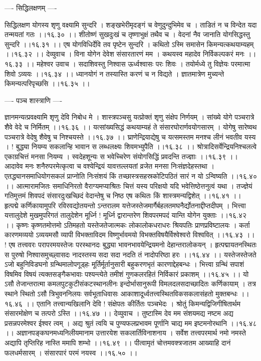 \documentclass[11pt]{book}
\begin{document}
\begin{landscape}
---- सिद्धिलक्षणम् ----

सिद्धिलक्षण योगस्य शृणु वक्ष्यामि सुन्दरि ।
शङ्खभेरीमृदङ्गं च वेणुदुन्दुभिमेव च ।
ताडितं न च विन्देत यदा तन्मयतां गतः ।।१६.३० ।।
शीतोष्णं सुखदुःखं च तृष्णाभुक्षं तथैव च ।
वेदनां नैव जानाति योगसिद्धस्तु सुन्दरि ।।१६.३१ ।।
एष योगविधिर्देवि तव पृष्टेन सुन्दरि ।
कथितो ऽस्मि समासेन किमन्यत्कथयाम्यहम् ।।१६.३२ ।।
देव्युवाच ।
विना योगेन देवेश संसारतारणं मम ।
कथयस्व महादेव निर्विकल्पकरं मनः ।।१६.३३ ।।
महेश्वर उवाच ।
सदाशिवस्तु निश्वास ऊर्ध्वश्वासः परः शिवः ।
तयोर्मध्ये तु विज्ञेयः परमात्मा शिवो ऽव्ययः ।।१६.३४ ।।
ध्यानयोगं न तस्यास्ति करणं च न विद्यते ।
ज्ञातमात्रेण मुच्यन्ते किमन्यत्परिपृच्छसि ।।१६.३५ ।।

---- पञ्च शास्त्राणि ----

ज्ञानमन्यत्प्रवक्ष्यामि शृणु देवि निबोध मे ।
शास्त्रपञ्चसु यत्प्रोक्तं शृणु संक्षेप निर्णयम् ।
सांख्ये योगे पञ्चरात्रे शैवे वेदे च निर्मितम् ।।१६.३६ ।।
यत्सांख्यसिद्धं कथयाम्यहं ते
संसारघोरार्णवयोगसारम् ।
योगेषु सारेष्वथ पञ्चरात्रे
वेदेषु शैवेषु च निश्चयस्ते ।।१६.३७ ।।
घ्राणेन्द्रियाद्येषु च यत्समस्तम
मनश्च लीनं भवतीव यस्य ।
! बुद्ध्या नियम्य सकलान्हि भावान
स लब्धलक्ष्यः शिवमभ्युपैति ।।१६.३८ ।।
श्रोत्रादिसर्वेन्द्रियनिश्चलत्वे
एकाग्रचित्तं मनसा नियम्य ।
स्वदेहशून्यः स भवेच्चिरेण
संयोगसिद्धिं प्रवदन्ति तज्ज्ञाः ।।१६.३९ ।।
आदावेव मनः शनैरुपरमेत्कृत्वा च वश्येन्द्रियं
यावत्तल्लयतां व्रजेत मनसा निःसंज्ञदेहस्तथा ।
एतद्ध्यानसमाधियोगसकलं प्राप्नोति निःसंशयं
किं तच्छास्त्रसहस्रकोटिपठितं सारं न यो ऽन्विष्यति ।।१६.४० ।।
आत्मारामजितः समाधिनिरतो वैराग्यमप्याश्रितः
चित्तं यस्य परिक्षयो यदि भवेत्तिष्ठेत्तनुत्वं यथा ।
तज्ज्ञेयं गतिमुत्तमं शिवपदं संसारदुःखच्छिदं
वेदान्तेषु च निष्ठ एष कथितः किं शास्त्रमन्यद्विशेत् ।।१६.४१ ।।
हृत्पद्मे कर्णिकायामुपरि रविरवद्योतयन्तो ऽन्तरालम
यत्तेजस्तेजमार्गैर्बहलतमघनैर्द्योतनाद्दीप्तदीपम् ।
भित्त्वा यत्तालुदेशे मुखमुपरिगतं तालुदेशेन मूर्ध्नि
! मूर्ध्नि द्वारान्तरेण शिवपरमपदं यान्ति योगेन युक्ताः ।।१६.४२ ।।
कृष्णः कृष्णतमोत्तमो ऽतिमहतो यस्तेजतेजात्मकः
लोकालोकधराधरः श्रियपतिः प्राणप्रविष्टालयः ।
कर्ता कारणमव्ययो ऽव्ययमसौ व्यापी विभक्ताविदम
विष्णुर्भावमयो विभक्तविषयैर्विश्वेश्वरो विश्ववित् ।।१६.४३ ।।
! एष तत्त्ववरः परापरमयस्तेजः परस्थानदः
बुद्ध्या भावनभावयेन्द्रियमनो देहान्तरालोकयन् ।
हृत्पद्मायतनस्थितः स पुरुषो निश्वासमुच्छ्वासदः
नादस्तस्य सदा सदा नदति तं नादोपरिष्ठा हरः ।।१६.४४ ।।
यस्तेजस्तेजते ऽजो बहुनिविडघनो ग्रन्थिमालोपगूड्हः
मूर्तिर्मूर्तानुसारी बहुकरणभृतं कारणाद्देहबन्धः ।
भित्त्वा ग्रन्थिं सपाशं विषमिव विषयं त्यक्तसङ्गैकभावाः
पश्यन्त्येते तमीशं गुणकलरहितं निर्विकारं प्रकाशम् ।।१६.४५ ।।
यो ऽसौ तेजान्तरात्मा कमलपुटकुटीसंकटस्थानलीनः
इन्दोर्भासानुरूपी विमलदलसदाच्छादितः कर्णिकायाम् ।
तत्र स्थाने स्थितो ऽसौ त्रिभुवननिलयः सर्वभूताधिवासः
आकाशादूर्ध्वतत्त्वस्थितविकसकलासंहतो मुक्तबन्धः ।।१६.४६ ।।
एतानि तत्त्वान्यखिलानि देवि
! संक्षेपतः कीर्तितः पञ्चभेदः ।
श्रोतुं किमन्यद्विजिगीषितार्थम
संसारमोक्षेण च तत्परो ऽस्ति ।।१६.४७ ।।
देव्युवाच ।
तुष्टास्मि देव मम संशयमद्य नष्टम
अद्य प्रसन्नपरमेश्वर ईश्वर त्वम् ।
अद्य श्रुतं त्वयि च पुण्यफलप्रभावम
पूर्णानि चाद्य मम इष्टमनोरथानि ।।१६.४८ ।।
अज्ञानपङ्कघनमध्यनिलीयमानाम
उत्तारयेश सकलार्तिविनाशनाय ।
सर्वेश तत्त्वपरमार्थ नमो नमस्ते
अद्यापि तृप्तिरिह नास्ति ममापि शम्भो ।।१६.४९ ।।
पीत्वामृतं चोत्तमवक्त्रजातम
आख्याहि दानं फलधर्मसारम् ।
संसारपारं परमं नयस्व ।।१६.५० ।।


\end{landscape}
\end{document}
